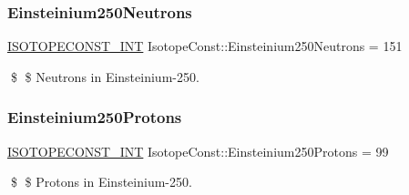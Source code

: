 \subsubsection{\texorpdfstring{Einsteinium250\+Neutrons}{Einsteinium250Neutrons}}
{\footnotesize\ttfamily \mbox{\hyperlink{group___isotope_const-_macros_ga5f18360b3e99483a35c32d789e62621c}{I\+S\+O\+T\+O\+P\+E\+C\+O\+N\+S\+T\+\_\+\+I\+NT}} Isotope\+Const\+::\+Einsteinium250\+Neutrons = 151}

\$ \$ Neutrons in Einsteinium-\/250. \mbox{\label{group___isotope_const-_einsteinium-_es250_gaa9b862147922a466cc8599aca2797a48}} 
\subsubsection{\texorpdfstring{Einsteinium250\+Protons}{Einsteinium250Protons}}
{\footnotesize\ttfamily \mbox{\hyperlink{group___isotope_const-_macros_ga5f18360b3e99483a35c32d789e62621c}{I\+S\+O\+T\+O\+P\+E\+C\+O\+N\+S\+T\+\_\+\+I\+NT}} Isotope\+Const\+::\+Einsteinium250\+Protons = 99}

\$ \$ Protons in Einsteinium-\/250. 